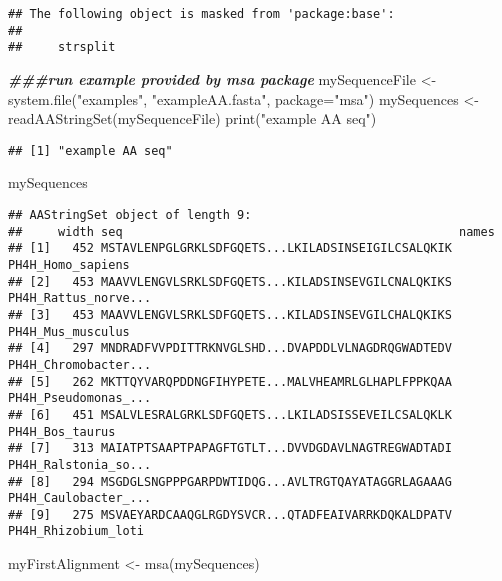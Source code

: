 \documentclass[
]{article}
\newenvironment{Shaded}{\begin{snugshade}}{\end{snugshade}}
\newcommand{\AttributeTok}[1]{\textcolor[rgb]{0.77,0.63,0.00}{#1}}
\newcommand{\DocumentationTok}[1]{\textcolor[rgb]{0.56,0.35,0.01}{\textbf{\textit{#1}}}}
\newcommand{\FunctionTok}[1]{\textcolor[rgb]{0.00,0.00,0.00}{#1}}
\newcommand{\NormalTok}[1]{#1}
\newcommand{\OtherTok}[1]{\textcolor[rgb]{0.56,0.35,0.01}{#1}}
\newcommand{\StringTok}[1]{\textcolor[rgb]{0.31,0.60,0.02}{#1}}
\begin{document}
\begin{verbatim}
## The following object is masked from 'package:base':
## 
##     strsplit
\end{verbatim}

\begin{Shaded}
\begin{Highlighting}[]
\DocumentationTok{\#\#\#run example provided by msa package}
\NormalTok{mySequenceFile }\OtherTok{\textless{}{-}} \FunctionTok{system.file}\NormalTok{(}\StringTok{"examples"}\NormalTok{, }\StringTok{"exampleAA.fasta"}\NormalTok{, }\AttributeTok{package=}\StringTok{"msa"}\NormalTok{)}
\NormalTok{mySequences }\OtherTok{\textless{}{-}} \FunctionTok{readAAStringSet}\NormalTok{(mySequenceFile)}
\FunctionTok{print}\NormalTok{(}\StringTok{"example AA seq"}\NormalTok{)}
\end{Highlighting}
\end{Shaded}

\begin{verbatim}
## [1] "example AA seq"
\end{verbatim}

\begin{Shaded}
\begin{Highlighting}[]
\NormalTok{mySequences}
\end{Highlighting}
\end{Shaded}

\begin{verbatim}
## AAStringSet object of length 9:
##     width seq                                               names               
## [1]   452 MSTAVLENPGLGRKLSDFGQETS...LKILADSINSEIGILCSALQKIK PH4H_Homo_sapiens
## [2]   453 MAAVVLENGVLSRKLSDFGQETS...KILADSINSEVGILCNALQKIKS PH4H_Rattus_norve...
## [3]   453 MAAVVLENGVLSRKLSDFGQETS...KILADSINSEVGILCHALQKIKS PH4H_Mus_musculus
## [4]   297 MNDRADFVVPDITTRKNVGLSHD...DVAPDDLVLNAGDRQGWADTEDV PH4H_Chromobacter...
## [5]   262 MKTTQYVARQPDDNGFIHYPETE...MALVHEAMRLGLHAPLFPPKQAA PH4H_Pseudomonas_...
## [6]   451 MSALVLESRALGRKLSDFGQETS...LKILADSISSEVEILCSALQKLK PH4H_Bos_taurus
## [7]   313 MAIATPTSAAPTPAPAGFTGTLT...DVVDGDAVLNAGTREGWADTADI PH4H_Ralstonia_so...
## [8]   294 MSGDGLSNGPPPGARPDWTIDQG...AVLTRGTQAYATAGGRLAGAAAG PH4H_Caulobacter_...
## [9]   275 MSVAEYARDCAAQGLRGDYSVCR...QTADFEAIVARRKDQKALDPATV PH4H_Rhizobium_loti
\end{verbatim}

\begin{Shaded}
\begin{Highlighting}[]
\NormalTok{myFirstAlignment }\OtherTok{\textless{}{-}} \FunctionTok{msa}\NormalTok{(mySequences)}
\end{Highlighting}
\end{Shaded}
\end{document}
